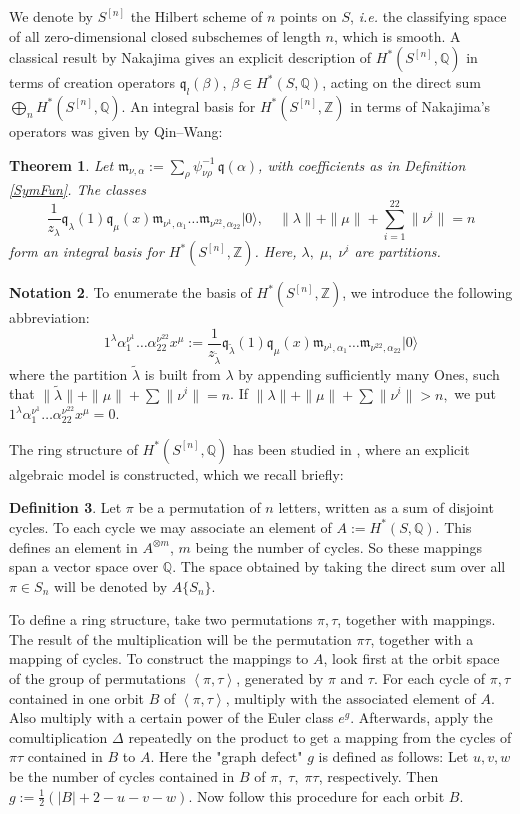 \documentclass{amsart}
\newcommand{\hilb}[1]{^{[#1]}}
\newcommand{\ie}{{\it i.e. }}
\newcommand{\vac}{|0\rangle}
\newcommand{\IQ}{\mathbb{Q}}
\newcommand{\IZ}{\mathbb{Z}}
\newcommand{\km}{\mathfrak{m}}
\newcommand{\kq}{\mathfrak{q}}
\theoremstyle{plain}
\newtheorem{theorem}{Theorem}[section]
\theoremstyle{definition}
\newtheorem{definition}[theorem]{Definition}
\newtheorem{notation}[theorem]{Notation}
\theoremstyle{remark}
\begin{document}
We denote by $S\hilb{n}$ the Hilbert scheme of $n$ points on $S$, \ie the classifying space of all zero-dimensional closed subschemes of length $n$, which is smooth. 
A classical result by Nakajima gives an explicit description of $H^\ast(S\hilb{n},\IQ)$ in terms of creation operators
$\kq_l(\beta)$, 
$\beta\in H^\ast(S,\IQ)$, acting on the direct sum 
$\bigoplus_n H^\ast(S\hilb{n},\IQ)$. 
An integral basis for $H^\ast(S\hilb{n},\IZ)$ in terms of Nakajima's operators was given by Qin--Wang:
\begin{theorem} \cite[Thm. 5.4.]{QinWang} Let $\km_{\nu,\alpha} := \sum_\rho \psi_{\nu\rho}^{-1}\,\kq(\alpha)$, with coefficients as in Definition \ref{SymFun}. The classes
$$ \frac{1}{z_\lambda} \kq_\lambda(1)\kq_\mu(x)\km_{\nu^1,\alpha_1}\ldots\km_{\nu^{22},\alpha_{22}}\vac,\quad \|\lambda\| +\|\mu\| + \sum_{i=1}^{22}\|\nu^i\| = n
$$ 
form an integral basis for $H^\ast(S\hilb{n},\IZ)$. Here,
$\lambda,\; \mu,\; \nu^i$ are partitions.
\end{theorem}
\begin{notation}
To enumerate the basis of $H^\ast(S\hilb{n},\IZ)$, we introduce the following abbreviation:
$$ 
1^\lambda \alpha_1^{\nu^1}\ldots\alpha_{22}^{\nu^{22}}x^\mu :=
\frac{1}{z_{\tilde{\lambda}} }
\kq_{\tilde{\lambda}}(1)\kq_\mu(x)\km_{\nu^1,\alpha_1}\ldots\km_{\nu^{22},\alpha_{22}}\vac
$$
where the partition $\tilde{\lambda}$ is built from $\lambda$ by appending sufficiently many Ones, such that $\|\tilde{\lambda}\| +\|\mu\| + \sum\|\nu^i\| = n $. If $\|\lambda\| +\|\mu\| + \sum\|\nu^i\| > n, $ we put $1^\lambda \alpha_1^{\nu^1}\ldots\alpha_{22}^{\nu^{22}}x^\mu =0$.
\end{notation}
The ring structure of $H^\ast(S\hilb{n}, \IQ)$ has been studied in \cite{LehnSorger}, where an explicit algebraic model is constructed, which we recall briefly:
\begin{definition} \cite[Sect. 2]{LehnSorger}
Let $\pi$ be a permutation of $n$ letters, written as a sum of disjoint cycles. To each cycle we may associate an element of $A:=H^\ast(S,\IQ)$. This defines an element in $A^{\otimes m}$, $m$ being the number of cycles. So these mappings span a vector space over $\IQ$. The space obtained by taking the direct sum over all $\pi \in S_n$ will be denoted by $A\{S_n\}$. 

To define a ring structure, take two permutations $\pi,\tau$, together with mappings. The result of the multiplication will be the permutation $\pi\tau$, together with a mapping of cycles. To construct the mappings to $A$, look first at the orbit space of the group of permutations $\left<\pi,\tau\right>$, generated by $\pi$ and $\tau$. For each cycle of $\pi, \tau$ contained in one orbit $B$ of $\left<\pi,\tau\right>$, multiply with the associated element of $A$. Also multiply with a certain power of the Euler class $e^g$. 
Afterwards, apply the comultiplication $\Delta$ repeatedly on the product to get a mapping from the cycles of $\pi\tau$ contained in $B$ to $A$. 
Here the "graph defect" $g$ is defined as follows: Let $u,v,w$ be the number of cycles contained in $B$ of $\pi,\;\tau,\;\pi\tau$, respectively. Then $g:=\frac{1}{2}\left(|B| + 2- u-v-w\right)$. Now follow this procedure for each orbit $B$. 

\end{definition}
\end{document}
